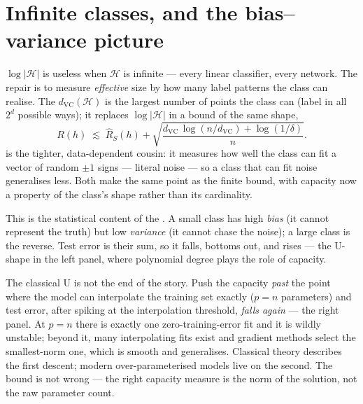 \documentclass[11pt]{article}
\begin{document}
\section{Infinite classes, and the bias--variance picture}

$\log|\mathcal{H}|$ is useless when $\mathcal{H}$ is infinite --- every linear
classifier, every network. The repair is to measure \emph{effective} size by
how many label patterns the class can realise. The 
$d_{\mathrm{VC}}(\mathcal{H})$ is the largest number of points the class can
 (label in all $2^d$ possible ways); it replaces
$\log|\mathcal{H}|$ in a bound of the same shape,
\[
  R(h) \;\lesssim\; \widehat R_S(h)
       + \sqrt{\frac{d_{\mathrm{VC}}\,\log(n/d_{\mathrm{VC}}) + \log(1/\delta)}{n}}.
\]
 is the tighter, data-dependent cousin: it
measures how well the class can fit a vector of random $\pm1$ signs --- literal
noise --- so a class that can fit noise generalises less. Both make the same
point as the finite bound, with capacity now a property of the class's shape
rather than its cardinality.

This is the statistical content of the . A
small class has high \emph{bias} (it cannot represent the truth) but low
\emph{variance} (it cannot chase the noise); a large class is the reverse. Test
error is their sum, so it falls, bottoms out, and rises --- the U-shape in the
left panel, where polynomial degree plays the role of capacity.

\begin{example}
The classical U is not the end of the story. Push the capacity \emph{past} the
point where the model can interpolate the training set exactly ($p=n$
parameters) and test error, after spiking at the interpolation threshold,
\emph{falls again} --- the right panel. At $p=n$ there is exactly one
zero-training-error fit and it is wildly unstable; beyond it, many interpolating
fits exist and gradient methods select the smallest-norm one, which is smooth
and generalises. Classical theory describes the first descent; modern
over-parameterised models live on the second. The bound is not wrong --- the
right capacity measure is the norm of the solution, not the raw parameter count.
\end{example}
\end{document}
